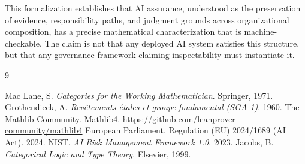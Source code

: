 \documentclass{article}
\begin{document}
This formalization establishes that AI assurance, understood as the preservation of evidence, responsibility paths, and judgment grounds across organizational composition, has a precise mathematical characterization that is machine-checkable. The claim is not that any deployed AI system satisfies this structure, but that any governance framework claiming inspectability must instantiate it.

\begin{thebibliography}{9}

 Mac Lane, S. \emph{Categories for the Working Mathematician}. Springer, 1971.
 Grothendieck, A. \emph{Revêtements étales et groupe fondamental (SGA 1)}. 1960.
 The Mathlib Community. Mathlib4. \url{https://github.com/leanprover-community/mathlib4}
 European Parliament. Regulation (EU) 2024/1689 (AI Act). 2024.
 NIST. \emph{AI Risk Management Framework 1.0}. 2023.
 Jacobs, B. \emph{Categorical Logic and Type Theory}. Elsevier, 1999.

\end{thebibliography}
\end{document}
